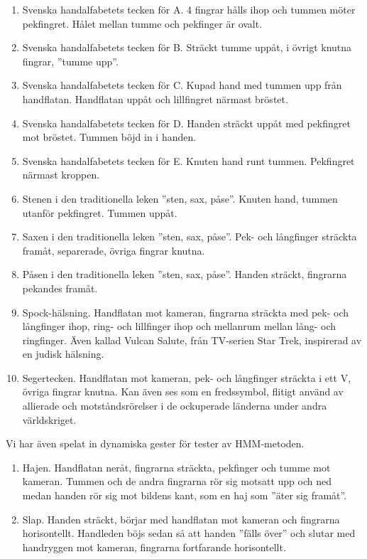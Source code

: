 \documentclass[../rapport_MVEX01-11-05]{subfiles}
\begin{document}
\begin{enumerate}
 	\item Svenska handalfabetets tecken för A. 4 fingrar hålls ihop och tummen
  möter pekfingret. Hålet mellan tumme och pekfinger är ovalt.

  \item Svenska handalfabetets tecken för B. Sträckt tumme uppåt, i övrigt knutna fingrar, ''tumme upp''.

  \item Svenska handalfabetets tecken för C. Kupad hand med tummen upp från handflatan. Handflatan uppåt
  och lillfingret närmast bröstet. 

  \item Svenska handalfabetets tecken för D. Handen sträckt uppåt med pekfingret mot bröstet. Tummen böjd
  in i handen.

  \item Svenska handalfabetets tecken för E. Knuten hand runt tummen. Pekfingret närmast kroppen. 

  \item Stenen i den traditionella leken ''sten, sax, påse''. Knuten hand, tummen utanför pekfingret. Tummen uppåt.

  \item Saxen i den traditionella leken ''sten, sax, påse''. Pek- och långfinger sträckta framåt, separerade, övriga
  fingrar knutna.

  \item Påsen i den traditionella leken ''sten, sax, påse''. Handen sträckt, fingrarna pekandes framåt.

  \item Spock-hälsning. Handflatan mot kameran, fingrarna sträckta med pek- och
  långfinger ihop, ring- och lillfinger ihop och mellanrum mellan
  lång- och ringfinger. Även kallad Vulcan Salute, från TV-serien Star
  Trek, inspirerad av en judisk hälsning.

  \item Segertecken. Handflatan mot kameran, pek- och långfinger sträckta i
  ett V, övriga fingrar knutna. Kan även ses som en fredssymbol,
  flitigt använd av allierade och motståndsrörelser i de ockuperade
  länderna under andra världskriget.
\end{enumerate}

Vi har även spelat in dynamiska gester för tester av HMM-metoden.
\begin{enumerate}
\item Hajen. Handflatan neråt, fingrarna sträckta, pekfinger och tumme
  mot kameran. Tummen och de andra fingrarna rör sig motsatt upp och
  ned medan handen rör sig mot bildens kant, som en haj som ''äter sig
  framåt''.
\item Slap. Handen sträckt, börjar med handflatan mot kameran och
  fingrarna horisontellt. Handleden böjs sedan så att handen ''fälls
  över'' och slutar med handryggen mot kameran, fingrarna fortfarande
  horisontellt. 
\end{enumerate}
\end{document}
